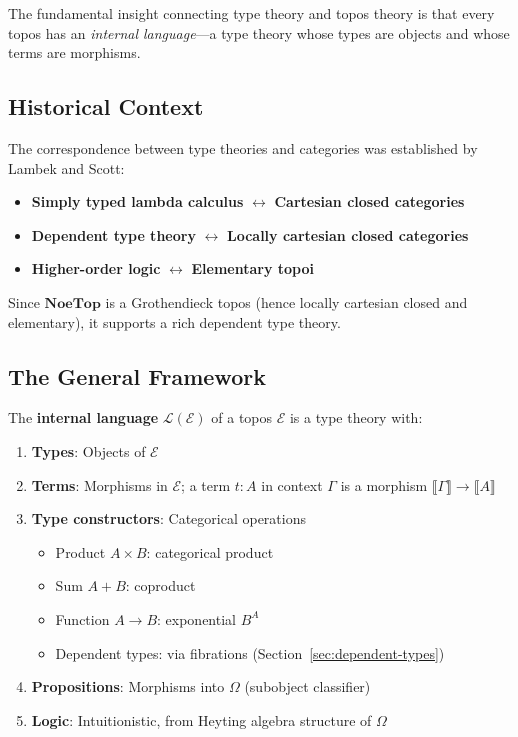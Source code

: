 The fundamental insight connecting type theory and topos theory is that every
topos has an \emph{internal language}---a type theory whose types are objects
and whose terms are morphisms.

\subsection{Historical Context}
\label{subsec:type-topos-history}

\begin{remark}
\label{rem:lambek-scott}
The correspondence between type theories and categories was established by
Lambek and Scott:
\begin{itemize}
  \item \textbf{Simply typed lambda calculus} $\leftrightarrow$ \textbf{Cartesian closed categories}
  \item \textbf{Dependent type theory} $\leftrightarrow$ \textbf{Locally cartesian closed categories}
  \item \textbf{Higher-order logic} $\leftrightarrow$ \textbf{Elementary topoi}
\end{itemize}
Since $\mathbf{NoeTop}$ is a Grothendieck topos (hence locally cartesian closed
and elementary), it supports a rich dependent type theory.
\end{remark}

\subsection{The General Framework}
\label{subsec:general-framework}

\begin{definition}
\label{def:internal-language-topos}
The \textbf{internal language} $\mathcal{L}(\mathcal{E})$ of a topos $\mathcal{E}$ is a
type theory with:
\begin{enumerate}[label=(\roman*)]
  \item \textbf{Types}: Objects of $\mathcal{E}$
  \item \textbf{Terms}: Morphisms in $\mathcal{E}$; a term $t : A$ in context $\Gamma$
        is a morphism $\llbracket \Gamma \rrbracket \to \llbracket A \rrbracket$
  \item \textbf{Type constructors}: Categorical operations
        \begin{itemize}
          \item Product $A \times B$: categorical product
          \item Sum $A + B$: coproduct
          \item Function $A \to B$: exponential $B^A$
          \item Dependent types: via fibrations (Section~\ref{sec:dependent-types})
        \end{itemize}
  \item \textbf{Propositions}: Morphisms into $\Omega$ (subobject classifier)
  \item \textbf{Logic}: Intuitionistic, from Heyting algebra structure of $\Omega$
\end{enumerate}
\end{definition}

